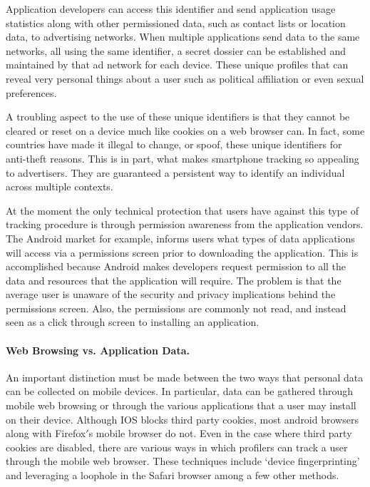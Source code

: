 Application developers can access this identifier and send application usage statistics along with other permissioned data, such as contact lists or location data, to advertising networks. When multiple applications send data to the same networks, all using the same identifier, a secret dossier can be established and maintained by that ad network for each device\cite{Thru2010}.
These unique profiles that can reveal very personal things about a user such as political affiliation or even sexual preferences\cite{whattheyknow}.

A troubling aspect to the use of these unique identifiers is that they cannot be cleared or reset on a device much like cookies on a web browser can. In fact, some countries have made it illegal to change, or spoof, these unique identifiers for anti-theft reasons. \cite{imei} This is in part, what makes smartphone tracking so appealing to advertisers. They are guaranteed a persistent way to identify an individual across multiple contexts.

At the moment the only technical protection that users have against this type of tracking procedure is through permission awareness from the application vendors. The Android market for example, informs users what types of data applications will access via a permissions screen prior to downloading the application. This is accomplished because Android makes developers request permission to all the data and resources that the application will require. The problem is that the average user is unaware of the security and privacy implications behind the permissions screen. Also, the permissions are commonly not read, and instead seen as a click through screen to installing an application\cite{ftcnotices}.   

		\paragraph{Web Browsing vs. Application Data.}
An important distinction must be made between the two ways that personal data can be collected on mobile devices. In particular, data can be gathered through mobile web browsing or through the various applications that a user may install on their device. Although IOS blocks third party cookies, most android browsers along with Firefox$'$s mobile browser do not\cite{Trust2013b}.  Even in the case where third party cookies are disabled, there are various ways in which profilers can track a user through the mobile web browser. These techniques include `device fingerprinting'\cite{Eff2010} and leveraging a loophole in the Safari browser \cite{John2012} among a few other methods\cite{Trust2013b}. 

